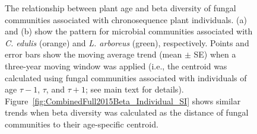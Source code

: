\clearpage
\begin{figure}[h]
	\centering
	\caption[The relationship between plant age and beta diversity of fungal communities associated with chronosequence plant individuals when a three-year moving window was applied.]
		{\hspace{1mm} The relationship between plant age and beta diversity of fungal communities associated with chronosequence plant individuals.
		(a) and (b) show the pattern for microbial communities associated with \textit{C. edulis} (orange) and \textit{L. arboreus} (green), respectively.
		Points and error bars show the moving average trend (mean $\pm$ SE) when a three-year moving window was applied (i.e., the centroid was calculated using fungal communities associated with individuals of age $\tau - 1$, $\tau$, and $\tau + 1$; see main text for details). 
		Figure~\ref{fig:CombinedFull2015Beta_Individual_SI} shows similar trends when beta diversity was calculated as the distance of fungal communities to their age-specific centroid. 
		} 
	\label{fig:CombinedFull2015Beta_Individual}
\end{figure}



